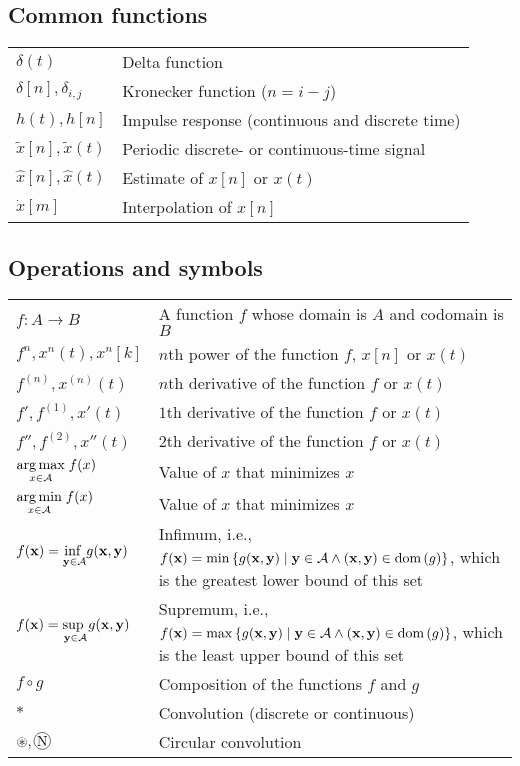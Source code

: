 \documentclass{article}
\newcommand*\circconv[1]{%
\tikz[baseline=(C.base)]\node[draw,circle,inner sep=0.5pt](C) {#1};\!
}
\newcommand{\dom}[1]{\ensuremath{\textnormal{dom}\left(#1\right)}} %
\begin{document}
\subsection{Common functions}
\begin{xltabular}{\textwidth}{XX}
    \(\delta(t)\) & Delta function\\
    \(\delta[n], \delta_{i,j}\) & Kronecker function (\(n = i-j\))\\
    \(h(t), h[n]\) & Impulse response (continuous and discrete time)\\
    \(\tilde{x}[n], \tilde{x}(t)\) & Periodic discrete- or continuous-time signal\\
    \(\hat{x}[n], \hat{x}(t)\) & Estimate of \(x[n]\) or \(x(t)\)\\
    \(\dot{x}[m]\) & Interpolation of \(x[n]\)\\
\end{xltabular}
\subsection{Operations and symbols}
\begin{xltabular}{\textwidth}{XX}
    \(f: A \rightarrow B\)& A function \(f\) whose domain is \(A\) and codomain is \(B\)\\
    \(f^{n}, x^{n}(t), x^{n}[k]\) & \(n\)th power of the function \(f\), \(x[n]\) or \(x(t)\)\\
    \(f^{\left( n \right)},  x^{(n)}(t)\) & \(n\)th derivative of the function \(f\) or \(x(t)\)\\
    \(f', f^{\left( 1 \right)}, x'(t)\) & \(1\)th derivative of the function \(f\) or \(x(t)\)\\
    \(f'', f^{\left( 2 \right)}, x''(t)\) & \(2\)th derivative of the function \(f\) or \(x(t)\)\\
    \(\argmax[x \in \mathcal{A}]{f(x)} \) & Value of \(x\) that minimizes \(x\)\\
    \( \argmin[x \in \mathcal{A}]{f(x)} \) & Value of \(x\) that minimizes \(x\)\\
    \(f(\mathbf{x}) = \underset{\mathbf{y} \in \mathcal{A}}{\textnormal{inf }} g(\mathbf{x},\mathbf{y})\) & Infimum, i.e., \(f(\mathbf{x}) = \min{\left\{ g(\mathbf{x}, \mathbf{y}) \mid \mathbf{y} \in \mathcal{A} \wedge \left( \mathbf{x}, \mathbf{y} \right) \in \dom{g} \right\}}\), which is the greatest lower bound of this set\\
    \(f(\mathbf{x}) = \underset{\mathbf{y} \in \mathcal{A}}{\textnormal{sup }} g(\mathbf{x},\mathbf{y})\) & Supremum, i.e., \(f(\mathbf{x}) = \max{\left\{ g(\mathbf{x}, \mathbf{y}) \mid \mathbf{y} \in \mathcal{A} \wedge \left( \mathbf{x}, \mathbf{y} \right) \in \dom{g} \right\}}\), which is the least upper bound of this set\\
    \(f \circ g\) & Composition of the functions \(f\) and \(g\)\\
    \(*\) & Convolution (discrete or continuous)\\
    \(\circledast, \circconv{N}\) & Circular convolution \cite{oppenheimDiscreteTimeSignalProcessing2009}\\
\end{xltabular}
\end{document}
